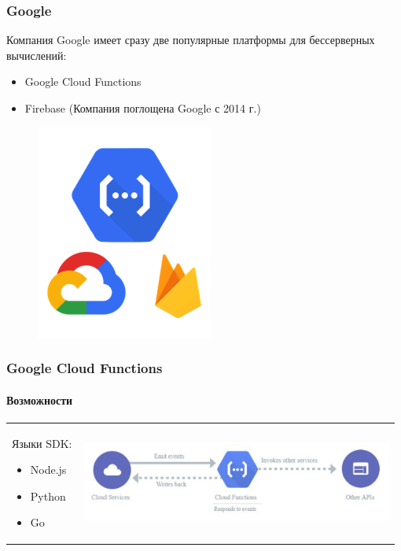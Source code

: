 \documentclass{beamer}
\begin{document}
    \begin{frame}
        \frametitle{Google}
        Компания Google имеет сразу две популярные платформы для бессерверных вычислений:

        \begin{itemize}
            \item Google Cloud Functions
            \item Firebase (Компания поглощена Google с 2014 г.)
        \end{itemize}

        \begin{figure}
            \includegraphics[width=0.3\linewidth]{images/Google}
        \end{figure}
    \end{frame}

    \begin{frame}
        \frametitle{Google Cloud Functions}
        \framesubtitle{Возможности}
        \begin{tabular}{m{0.18\linewidth}m{0.8\linewidth}}
            {
            \small
            Языки SDK:
            \begin{itemize}
                \item Node.js
                \item Python
                \item Go
            \end{itemize}
            }
            &
            \centering
            \includegraphics[width=\linewidth]{images/google-opp}
 		\end{tabular}
    \end{frame}
\end{document}
